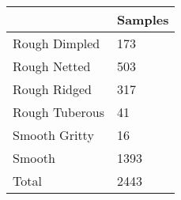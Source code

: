 \begin{tabular}{ll}
\toprule
{} & Samples \\
\midrule
Rough Dimpled  &     173 \\
Rough Netted   &     503 \\
Rough Ridged   &     317 \\
Rough Tuberous &      41 \\
Smooth Gritty  &      16 \\
Smooth         &    1393 \\
Total          &    2443 \\
\bottomrule
\end{tabular}
